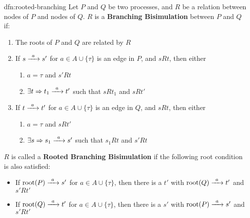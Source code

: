\documentclass[../hons_project.tex]{subfiles}
\begin{document}
\begin{dfn}{dfn:rooted-branching}{}
   Let $P$ and $Q$ be two processes, and $R$ be a relation between nodes of $P$ and nodes of $Q$. $R$ is a \textbf{Branching Bisimulation} between $P$ and $Q$ if:
   \begin{enumerate}
      \item The roots of $P$ and $Q$ are related by $R$
      \item If $s \prightarrow{a} s'$ for $a\in A \cup \{\tau\}$ is an edge in $P$, and $s R t$, then either
	 \begin{enumerate}[label=\alph*)]
	    \item $a= \tau$ and $s' R t$
	    \item $\exists t \Rightarrow t_{1} \prightarrow{a} t'$ such that $s R t_{1}$ and $s R t'$
	 \end{enumerate}
      \item If $t \prightarrow{a} t'$ for $a\in A \cup \{\tau\}$ is an edge in $Q$, and $s R t$, then either
	 \begin{enumerate}[label=\alph*)]
	    \item $a= \tau$ and $s R t'$
	    \item $\exists s \Rightarrow s_{1} \prightarrow{a} s'$ such that $s_{1} R t$ and $s' R t$
	 \end{enumerate}
   \end{enumerate}

   \longrule{0.08ex}

   $R$ is called a \textbf{Rooted Branching Bisimulation} if the following root condition is also satisfied:
   \begin{itemize}
      \item If $\mathrm{root}(P) \prightarrow{a} s'$ for $a\in A \cup \{\tau\}$, then there is a $t'$ with $\mathrm{root}(Q)\prightarrow{a} t'$ and $s' R t'$
      \item If $\mathrm{root}(Q) \prightarrow{a} t'$ for $a\in A \cup \{\tau\}$, then there is a $s'$ with $\mathrm{root}(P)\prightarrow{a} s'$ and $s' R t'$
   \end{itemize}
\end{dfn}
\end{document}
